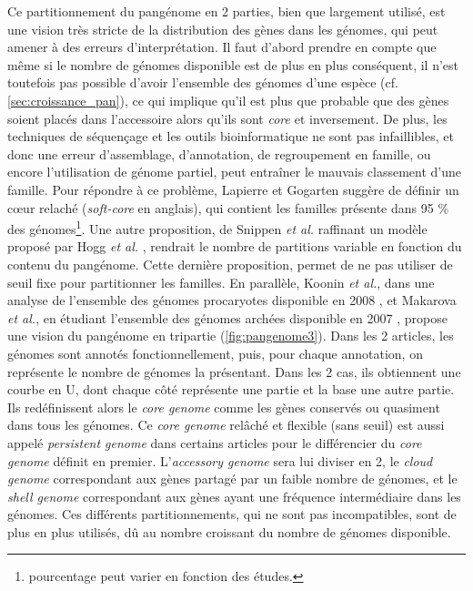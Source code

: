 Ce partitionnement du pangénome en 2 parties, bien que largement utilisé, est une vision très stricte de la distribution des gènes dans les génomes, qui peut amener à des erreurs d'interprétation. Il faut d'abord prendre en compte que même si le nombre de génomes disponible est de plus en plus conséquent, il n'est toutefois pas possible d'avoir l'ensemble des génomes d'une espèce (cf. \autoref{sec:croissance_pan}), ce qui implique qu'il est plus que probable que des gènes soient placés dans l'accessoire alors qu'ils sont \textit{core} et inversement. De plus, les techniques de séquençage et les outils bioinformatique ne sont pas infaillibles, et donc une erreur d'assemblage, d'annotation, de regroupement en famille, ou encore l'utilisation de génome partiel, peut entraîner le mauvais classement d'une famille. Pour répondre à ce problème, Lapierre et Gogarten \cite{lapierre_estimating_2009} suggère de définir un c\oe ur relaché (\textit{soft-core} en anglais), qui contient les familles présente dans 95 \% des génomes\footnote{pourcentage peut varier en fonction des études.}. Une autre proposition, de Snippen \textit{et al.} \cite{snipen_microbial_2009} raffinant un modèle proposé par Hogg \textit{et al.} \cite{hogg_characterization_2007}, rendrait le nombre de partitions variable en fonction du contenu du pangénome. Cette dernière proposition, permet de ne pas utiliser de seuil fixe pour partitionner les familles. En parallèle, Koonin \textit{et al.}, dans une analyse de l'ensemble des génomes procaryotes disponible en 2008 \cite{koonin_genomics_2008}, et Makarova \textit{et al.}, en étudiant l'ensemble des génomes archées disponible en 2007 \cite{makarova_clusters_2007}, propose une vision du pangénome en tripartie (\autoref{fig:pangenome3}). Dans les 2 articles, les génomes sont annotés fonctionnellement, puis, pour chaque annotation, on représente le nombre de génomes la présentant. Dans les 2 cas, ils obtiennent une courbe en U, dont chaque côté représente une partie et la base une autre partie. Ils redéfinissent alors le \textit{core genome} comme les gènes conservés ou quasiment dans tous les génomes. Ce \textit{core genome} relâché et flexible (sans seuil) est aussi appelé \textit{persistent genome} dans certains articles pour le différencier du \textit{core genome} définit en premier. L'\textit{accessory genome} sera lui diviser en 2, le \textit{cloud genome} correspondant aux gènes partagé par un faible nombre de génomes, et le \textit{shell genome} correspondant aux gènes ayant une fréquence intermédiaire dans les génomes. Ces différents partitionnements, qui ne sont pas incompatibles, sont de plus en plus utilisés, dû au nombre croissant du nombre de génomes disponible. 


